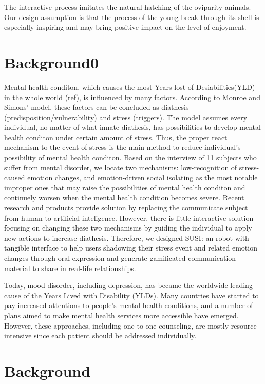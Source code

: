 \documentclass[manuscript,screen]{acmart}
\begin{document}
The interactive process imitates the natural hatching of the oviparity animals. Our design assumption is that the process of the young break through its shell is especially inspiring and may bring positive impact on the level of enjoyment.

\section{Background0}

Mental health conditon, which causes the most Years lost of Desiabilities(YLD) in the whole world (ref), is influenced by many factors. According to Monroe and Simons' model, these factors can be concluded as diathesis (predisposition/vulnerability) and stress (triggers). The model assumes every individual, no matter of what innate diathesis, has possibilities to develop mental health conditon under certain amount of stress. Thus, the proper react mechanism to the event of stress is the main method to reduce individual's possibility of mental health conditon. Based on the interview of 11 subjects who suffer from mental disorder, we locate two mechanisms: low-recognition of stress-caused emotion changes, and emotion-driven social isolating as the most notable improper ones that may raise the possibilities of mental health conditon and continuely worsen when the mental health condition becomes severe. Recent research and products provide solution by replacing the communicate subject from human to artificial inteligence. However, there is little interactive solution focusing on changing these two mechanisms by guiding the individual to apply new actions to increase diathesis. Therefore, we designed SUSI: an robot with tangible interface to help users shadowing their stress event and related emotion changes through oral expression and generate gamificated communication material to share in real-life relationships.

Today, mood disorder, including depression, has became the worldwide leading cause of the Years Lived with Disability (YLDs). Many countries have started to pay increased attentions to people’s mental health conditions, and a number of plans aimed to make mental health services more accessible have emerged. However, these approaches, including one-to-one counseling, are mostly resource-intensive since each patient should be addressed individually.


\section{Background}
\end{document}
